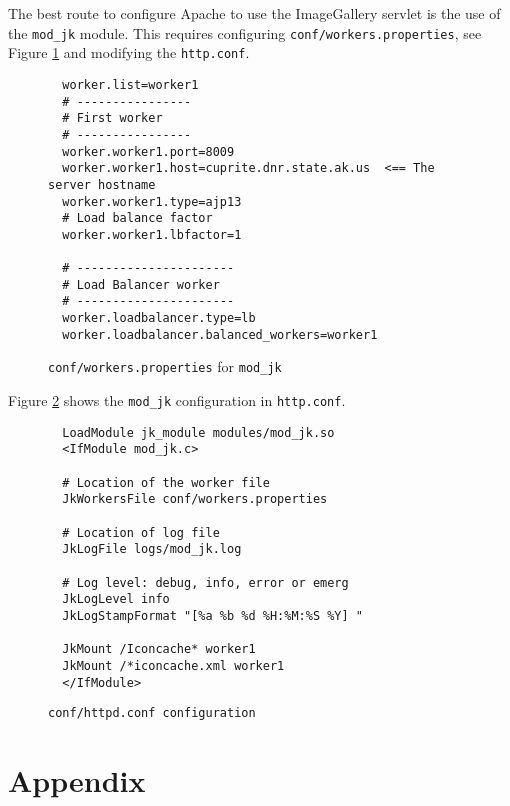 \documentclass[12pt,letterpaper,dvips]{article}
\newcommand{\cmd}[1]{\texttt{#1}}
\begin{document}
The best route to configure Apache to use the ImageGallery
servlet is the use of the \cmd{mod\_jk} module. This
requires configuring \texttt{conf/workers.properties}, 
see Figure \ref{fig:workers.properties} and modifying 
the \texttt{http.conf}.

\begin{center}
\begin{figure}[htb]
\begin{Verbatim}
  worker.list=worker1
  # ----------------
  # First worker
  # ----------------
  worker.worker1.port=8009
  worker.worker1.host=cuprite.dnr.state.ak.us  <== The server hostname
  worker.worker1.type=ajp13
  # Load balance factor
  worker.worker1.lbfactor=1

  # ----------------------
  # Load Balancer worker
  # ----------------------
  worker.loadbalancer.type=lb
  worker.loadbalancer.balanced_workers=worker1
\end{Verbatim}
\caption{\texttt{conf/workers.properties} for \cmd{mod\_jk}}
\label{fig:workers.properties}
\end{figure}
\end{center}

\noindent Figure \ref{fig:httpd.conf} shows the \cmd{mod\_jk}
configuration in \texttt{http.conf}.

\begin{center}
\begin{figure}[htb]
\begin{Verbatim}
  LoadModule jk_module modules/mod_jk.so
  <IfModule mod_jk.c>
        
  # Location of the worker file
  JkWorkersFile conf/workers.properties

  # Location of log file
  JkLogFile logs/mod_jk.log

  # Log level: debug, info, error or emerg
  JkLogLevel info
  JkLogStampFormat "[%a %b %d %H:%M:%S %Y] "

  JkMount /Iconcache* worker1
  JkMount /*iconcache.xml worker1
  </IfModule>
\end{Verbatim}
\caption{\texttt{conf/httpd.conf configuration}}
\label{fig:httpd.conf}
\end{figure}
\end{center}



\clearpage
\newpage
\section*{Appendix}
\end{document}
